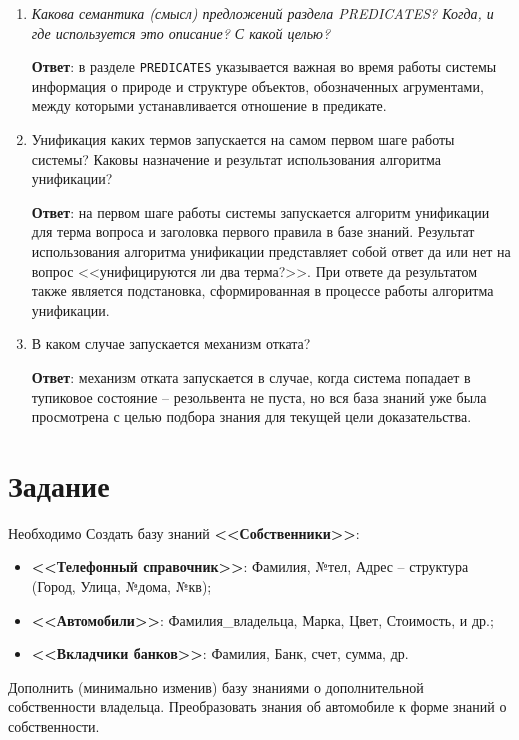 \begin{enumerate}
	\item \textit{Какова семантика (смысл) предложений раздела PREDICATES? Когда, и где используется это описание? С какой целью?}

	\qquad \textbf{Ответ}: в разделе \texttt{PREDICATES} указывается важная во время работы системы информация о природе и структуре объектов, обозначенных агрументами, между которыми устанавливается отношение в предикате.

	\item Унификация каких термов запускается на самом первом шаге работы системы? Каковы назначение и результат использования алгоритма унификации?
	
	\qquad \textbf{Ответ}: на первом шаге работы системы запускается алгоритм унификации для терма вопроса и заголовка первого правила в базе знаний. Результат использования алгоритма унификации представляет собой ответ да или нет на вопрос <<унифицируются ли два терма?>>. При ответе да результатом также является подстановка, сформированная в процессе работы алгоритма унификации.

	\item В каком случае запускается механизм отката?

	\qquad \textbf{Ответ}: механизм отката запускается в случае, когда система попадает в тупиковое состояние -- резольвента не пуста, но вся база знаний уже была просмотрена с целью подбора знания для текущей цели доказательства.
\end{enumerate}

\clearpage

{\large\section*{Задание}}

Необходимо Создать базу знаний \textbf{<<Собственники>>}:

\begin{itemize}[$\bullet$]
	\item \textbf{<<Телефонный справочник>>}: Фамилия, №тел, Адрес -- структура (Город, Улица, №дома, №кв);
	\item \textbf{<<Автомобили>>}: Фамилия\_владельца, Марка, Цвет, Стоимость, и др.;
	\item \textbf{<<Вкладчики банков>>}: Фамилия, Банк, счет, сумма, др.
\end{itemize}

Дополнить (минимально изменив) базу знаниями о дополнительной собственности владельца. Преобразовать знания об автомобиле к форме знаний о собственности.

